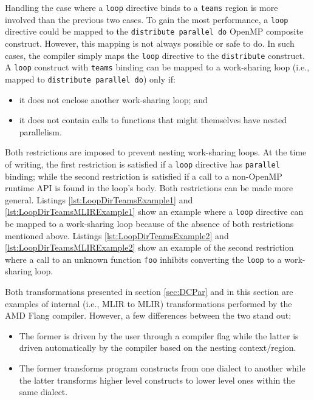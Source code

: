 \documentclass[acmtog,natbib=false]{acmart}
\newcommand{\code}[1]{\texttt{#1}\xspace}
\begin{document}
Handling the case where a \code{loop} directive binds to a \code{teams} region is more involved than the previous two cases.
To gain the most performance, a \code{loop} directive could be mapped to the \code{distribute parallel do} OpenMP composite construct.
However, this mapping is not always possible or safe to do.
In such cases, the compiler simply maps the \code{loop} directive to the \code{distribute} construct.
A \code{loop} construct with \code{teams} binding can be mapped to a work-sharing loop (i.e., mapped to \code{distribute parallel do}) only if:
\begin{itemize}
    \item it does not enclose another work-sharing loop; and
    \item it does not contain calls to functions that might themselves have nested parallelism.
\end{itemize}
Both restrictions are imposed to prevent nesting work-sharing loops.
At the time of writing, the first restriction is satisfied if a \code{loop} directive has \code{parallel} binding; while the second restriction is satisfied if a call to a non-OpenMP runtime API is found in the loop's body.
Both restrictions can be made more general.
Listings \ref{lst:LoopDirTeamsExample1} and \ref{lst:LoopDirTeamsMLIRExample1} show an example where a \code{loop} directive can be mapped to a work-sharing loop because of the absence of both restrictions mentioned above.
Listings \ref{lst:LoopDirTeamsExample2} and \ref{lst:LoopDirTeamsMLIRExample2} show an example of the second restriction where a call to an unknown function \code{foo} inhibits converting the \code{loop} to a work-sharing loop.

Both transformations presented in section \ref{sec:DCPar} and in this section are examples of internal (i.e., \ac{MLIR} to \ac{MLIR}) transformations performed by the AMD Flang compiler. However, a few differences between the two stand out:
\begin{itemize}
    \item The former is driven by the user through a compiler flag while the latter is driven automatically by the compiler based on the nesting context/region.
    \item The former transforms program constructs from one dialect to another while the latter transforms higher level constructs to lower level ones within the same dialect.
\end{itemize}
\end{document}
